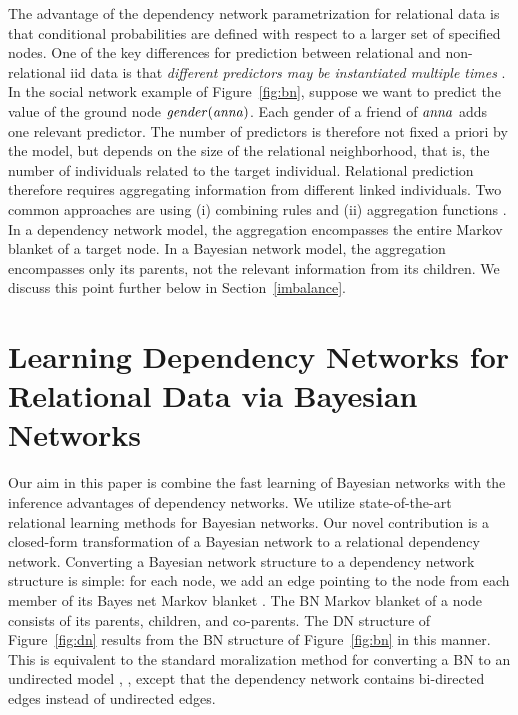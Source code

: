 \documentclass[twoside,11pt]{article}
\begin{document}
The advantage of the dependency network parametrization for relational data is that conditional probabilities are defined with respect to a larger set of specified nodes. One of the key differences for prediction between relational and non-relational iid data is that {\em different predictors may be instantiated multiple times} \cite{Natarajan2008}. In the social network example of Figure~\ref{fig:bn}, suppose we want to predict the value of the ground node $\it{gender}(anna)$. Each gender of a friend of $\it{anna}$ adds one relevant predictor. The number of predictors is therefore not fixed a priori by the model, but depends on the size of the relational neighborhood, that is, the number of individuals related to the target individual. Relational prediction therefore requires aggregating information from different linked individuals. Two common approaches are using (i) combining rules \cite{Kersting2007} and (ii) aggregation functions \cite{Getoor2007c}. In a dependency network model, the aggregation encompasses the entire Markov blanket of a target node. In a Bayesian network model, the aggregation encompasses only its parents, not the relevant information from its children. We discuss this point further below in Section~\ref{imbalance}. 

 \section{Learning Dependency Networks for Relational Data via Bayesian Networks} Our aim in this paper is combine the fast learning of Bayesian networks with the inference advantages of dependency networks. We utilize state-of-the-art relational learning methods for Bayesian networks. Our novel contribution is a closed-form transformation of a Bayesian network to a relational dependency network. Converting a Bayesian network structure to a dependency network structure is simple: for each node, we add an edge pointing to the node from each member of its Bayes net Markov blanket \cite{Heckerman2000}. The BN Markov blanket of a node consists of its parents, children, and co-parents. The DN structure of Figure~\ref{fig:dn} results from the BN structure of Figure~\ref{fig:bn} in this manner. This is equivalent to the standard moralization  method for converting a BN to an undirected model \cite[12.5.3]{Domingos2007}, \cite{Lauritzen1996}, except that the dependency network contains bi-directed edges instead of undirected edges. 
 
\end{document}
